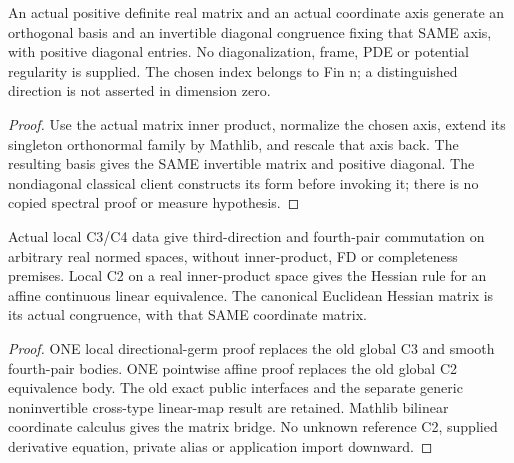 \begin{lemma}
  \label{lem:matrix-axis-frame}
  \leanok
  An actual positive definite real matrix and an actual coordinate axis
  generate an orthogonal basis and an invertible diagonal congruence fixing
  that SAME axis, with positive diagonal entries. No diagonalization, frame,
  PDE or potential regularity is supplied. The chosen index belongs to Fin n;
  a distinguished direction is not asserted in dimension zero.
\end{lemma}
\begin{proof}
  \leanok
  Use the actual matrix inner product, normalize the chosen axis, extend its
  singleton orthonormal family by Mathlib, and rescale that axis back.
  The resulting basis gives the SAME invertible matrix and positive diagonal.
  The nondiagonal classical client constructs its form before invoking it;
  there is no copied spectral proof or measure hypothesis.
\end{proof}

\begin{lemma}
  \label{lem:local-hessian-calculus}
  \leanok
  Actual local C3/C4 data give third-direction and fourth-pair commutation
  on arbitrary real normed spaces, without inner-product, FD or completeness
  premises. Local C2 on a real inner-product space gives the Hessian rule for
  an affine continuous linear equivalence. The canonical Euclidean Hessian
  matrix is its actual congruence, with that SAME coordinate matrix.
\end{lemma}
\begin{proof}
  \leanok
  ONE local directional-germ proof replaces the old global C3 and smooth
  fourth-pair bodies. ONE pointwise affine proof replaces the old global C2
  equivalence body. The old exact public interfaces and the separate generic
  noninvertible cross-type linear-map result are retained. Mathlib bilinear
  coordinate calculus gives the matrix bridge. No unknown reference C2,
  supplied derivative equation, private alias or application import downward.
\end{proof}

